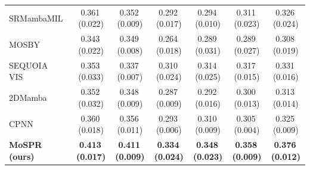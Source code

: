 \begin{tabular}{lcccccc}
SRMambaMIL~\citep{yang2024mambamil} & 0.361\,{\tiny(0.022)} & 0.352\,{\tiny(0.009)} & 0.292\,{\tiny(0.017)} & 0.294\,{\tiny(0.010)} & 0.311\,{\tiny(0.023)} & 0.326\,{\tiny(0.024)}\\
MOSBY~\citep{senbabaoglu2024mosby} & 0.343\,{\tiny(0.022)} & 0.349\,{\tiny(0.008)} & 0.264\,{\tiny(0.018)} & 0.289\,{\tiny(0.031)} & 0.289\,{\tiny(0.027)} & 0.308\,{\tiny(0.019)}\\
SEQUOIA VIS~\citep{pizurica2024sequoia} & 0.353\,{\tiny(0.033)} & 0.337\,{\tiny(0.007)} & 0.310\,{\tiny(0.024)} & 0.314\,{\tiny(0.025)} & 0.317\,{\tiny(0.015)} & 0.331\,{\tiny(0.016)}\\
2DMamba~\citep{zhang2025twodmamba} & 0.352\,{\tiny(0.032)} & 0.348\,{\tiny(0.009)} & 0.287\,{\tiny(0.009)} & 0.292\,{\tiny(0.016)} & 0.300\,{\tiny(0.013)} & 0.313\,{\tiny(0.014)}\\
CPNN~\citep{nishimura2026cpnn} & 0.360\,{\tiny(0.018)} & 0.356\,{\tiny(0.011)} & 0.293\,{\tiny(0.006)} & 0.310\,{\tiny(0.009)} & 0.305\,{\tiny(0.004)} & 0.325\,{\tiny(0.009)}\\
\midrule
\textbf{MoSPR (ours)} & \textbf{0.413\,{\tiny(0.017)}} & \textbf{0.411\,{\tiny(0.009)}} & \textbf{0.334\,{\tiny(0.024)}} & \textbf{0.348\,{\tiny(0.023)}} & \textbf{0.358\,{\tiny(0.009)}} & \textbf{0.376\,{\tiny(0.012)}}\\
\bottomrule
\end{tabular}